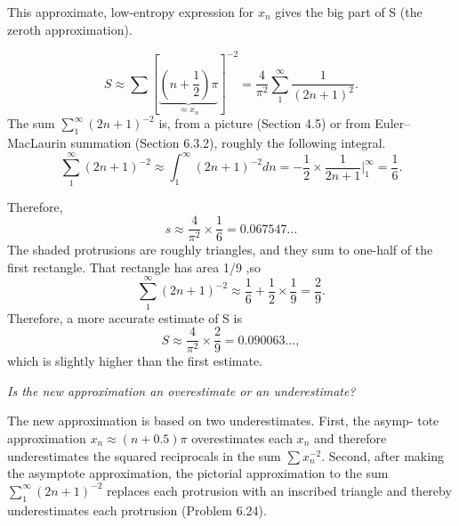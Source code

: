 \documentclass[fleqn]{book}
\newcounter{pro1}
\begin{document}
\Large\textrm{This approximate, low-entropy expression for $x_{n}$ gives the big part of S (the zeroth approximation).}

\begin{equation}
S\approx \sum[\underbrace{(n+\frac{1}{2})\pi}_{\approx x_{n}}]^{-2}=\frac{4}{\pi^{2}} \sum_{1}^∞ \frac{1}{(2n+1)^2}.
\end{equation}
\Large\textrm{The sum $\sum_{1}^∞ (2n+1)^{-2}$ is,  from  a  picture  (Section  4.5)  or  from  Euler–
MacLaurin summation (Section 6.3.2), roughly the following integral.}\\ 

\begin{equation}
\sum\limits_{1}^∞ (2n+1)^{-2}\approx\int_{1}^{∞}(2n+1)^{-2}dn=-\frac{1}{2}×\frac{1}{2n+1}\bigg|_1^∞=\frac{1}{6}.
\end{equation}
\newpage 
\pagestyle{fancy} 
\renewcommand{\headrulewidth}{0pt} 
\fancyhf{} %

\Large\textrm{Therefore,} 
\begin{equation}
s\approx \frac{4}{\pi^2} × \frac{1}{6}=0.067547...
\end{equation}
\Large\textrm{The shaded protrusions are roughly triangles,
and they sum to one-half of the first rectangle.
That rectangle has area 1/9 ,so}
\begin{equation}
\sum\limits_{1}^∞ (2n+1)^{-2}\approx\frac{1}{6}+\frac{1}{2}×\frac{1}{9}=\frac{2}{9}.
\end{equation}
\Large\textrm{Therefore, a more accurate estimate of S is} 
\begin{equation}
S\approx\frac{4}{\pi^{2}}×\frac{2}{9}=0.090063...,
\end{equation}
\Large\textrm{which is slightly higher than the first estimate.} 

\textsl{Is the new approximation an overestimate or an underestimate?}  

\Large\textrm{The new approximation is based on two underestimates.  First, the asymp-
tote approximation $x_{n} \approx(n+0.5)\pi$ overestimates each $x_{n}$ and therefore
underestimates the squared reciprocals in the sum $\sum{x_{n}^{-2}}$. Second, after
making the asymptote approximation, the pictorial approximation to the
sum $\sum_{1}^∞ (2n+1)^{-2}$ replaces each protrusion with an inscribed triangle
and thereby underestimates each protrusion (Problem 6.24).}
\end{document}
